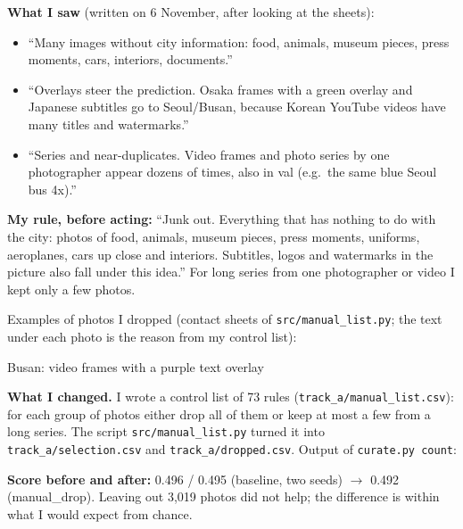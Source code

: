 \documentclass[11pt]{article}
\begin{document}
\textbf{What I saw} (written on 6 November, after looking at the sheets):
\begin{itemize}
  \item ``Many images without city information: food, animals, museum pieces,
    press moments, cars, interiors, documents.''
  \item ``Overlays steer the prediction. Osaka frames with a green overlay and
    Japanese subtitles go to Seoul/Busan, because Korean YouTube videos have
    many titles and watermarks.''
  \item ``Series and near-duplicates. Video frames and photo series by one
    photographer appear dozens of times, also in val (e.g.\ the same blue
    Seoul bus 4x).''
\end{itemize}

\textbf{My rule, before acting:} ``Junk out. Everything that has nothing to do
with the city: photos of food, animals, museum pieces, press moments,
uniforms, aeroplanes, cars up close and interiors. Subtitles, logos and
watermarks in the picture also fall under this idea.''
For long series from one photographer or video I kept only a few photos.

Examples of photos I dropped (contact sheets of \texttt{src/manual\_list.py};
the text under each photo is the reason from my control list):

\begin{center}
\begin{minipage}{0.48\linewidth}\centering
{}\par\small Busan: video frames with a purple text overlay
\end{minipage}
\end{center}

\textbf{What I changed.} I wrote a control list of 73 rules
(\texttt{track\_a/manual\_list.csv}): for each group of photos either drop all
of them or keep at most a few from a long series. The script
\texttt{src/manual\_list.py} turned it into \texttt{track\_a/selection.csv}
and \texttt{track\_a/dropped.csv}. Output of \texttt{curate.py count}:


\textbf{Score before and after:} 0.496 / 0.495 (baseline, two seeds)
$\to$ 0.492 (manual\_drop). Leaving out 3,019 photos did not help; the
difference is within what I would expect from chance.
\end{document}
